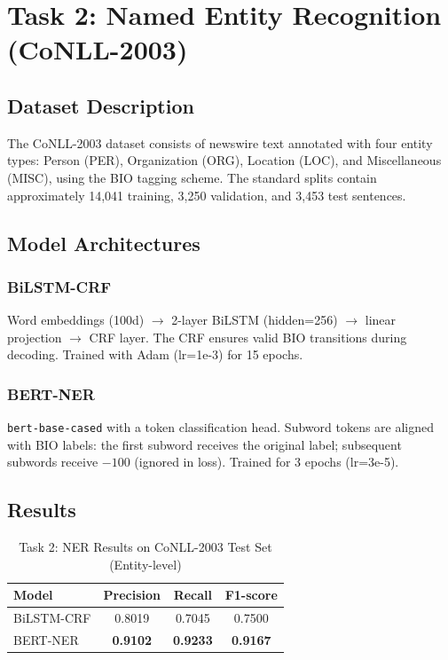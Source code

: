 \documentclass[12pt, a4paper]{article}
\begin{document}
\section{Task 2: Named Entity Recognition (CoNLL-2003)}

\subsection{Dataset Description}

The CoNLL-2003 dataset consists of newswire text annotated with four entity types: Person (PER), Organization (ORG), Location (LOC), and Miscellaneous (MISC), using the BIO tagging scheme. The standard splits contain approximately 14,041 training, 3,250 validation, and 3,453 test sentences.

\subsection{Model Architectures}

\subsubsection{BiLSTM-CRF}
Word embeddings (100d) $\rightarrow$ 2-layer BiLSTM (hidden=256) $\rightarrow$ linear projection $\rightarrow$ CRF layer. The CRF ensures valid BIO transitions during decoding. Trained with Adam (lr=1e-3) for 15 epochs.

\subsubsection{BERT-NER}
\texttt{bert-base-cased} with a token classification head. Subword tokens are aligned with BIO labels: the first subword receives the original label; subsequent subwords receive $-100$ (ignored in loss). Trained for 3 epochs (lr=3e-5).

\subsection{Results}

\begin{table}[H]
\centering
\caption{Task 2: NER Results on CoNLL-2003 Test Set (Entity-level)}
\label{tab:task2_results}
\begin{tabular}{lccc}
\toprule
\textbf{Model} & \textbf{Precision} & \textbf{Recall} & \textbf{F1-score} \\
\midrule
BiLSTM-CRF & 0.8019 & 0.7045 & 0.7500 \\
BERT-NER & \textbf{0.9102} & \textbf{0.9233} & \textbf{0.9167} \\
\bottomrule
\end{tabular}
\end{table}
\end{document}
